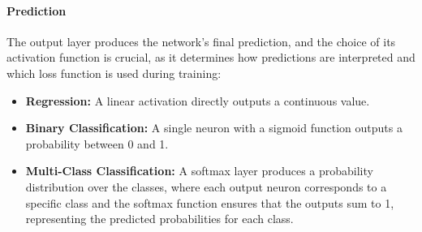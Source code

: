 \paragraph{Prediction}
The output layer produces the network's final prediction, and the choice of its activation function is crucial, as it determines how predictions are interpreted and which loss function is used during training:
\begin{itemize}
	\item \textbf{Regression:} A linear activation directly outputs a continuous value.
	\item \textbf{Binary Classification:} A single neuron with a sigmoid function outputs a probability between 0 and 1.
	\item \textbf{Multi-Class Classification:} A softmax layer produces a probability distribution over the classes, where each output neuron corresponds to a specific class and the softmax function ensures that the outputs sum to 1, representing the predicted probabilities for each class.
\end{itemize}




